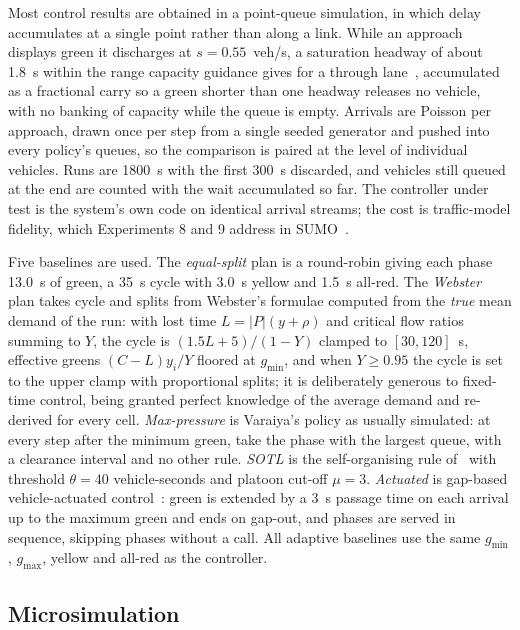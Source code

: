 \documentclass[journal]{IEEEtran}
\begin{document}
Most control results are obtained in a point-queue simulation, in which delay accumulates at a single point
rather than along a link. While an approach displays green it discharges at
$s = 0.55$~veh/s, a saturation headway of about 1.8~s within the range capacity guidance gives for a through
lane~\cite{trb2022hcm}, accumulated as a fractional carry so a green shorter than one headway releases no
vehicle, with no banking of capacity while the queue is empty. Arrivals are Poisson per approach, drawn once
per step from a single seeded generator and pushed into every policy's queues, so the comparison is paired at
the level of individual vehicles. Runs are 1800~s with the first 300~s discarded, and vehicles still queued at
the end are counted with the wait accumulated so far. The controller under test is the system's own code on
identical arrival streams; the cost is traffic-model fidelity, which Experiments 8 and 9 address in
SUMO~\cite{lopez2018microscopic}.

Five baselines are used. The \emph{equal-split} plan is a round-robin giving each phase 13.0~s of green, a
35~s cycle with 3.0~s yellow and 1.5~s all-red.
The \emph{Webster} plan takes cycle and splits from Webster's formulae computed from the \emph{true} mean
demand of the run: with lost time $L = |P|(y + \rho)$ and critical flow ratios summing to $Y$, the cycle is
$(1.5L + 5)/(1 - Y)$ clamped to $[30, 120]$~s, effective greens $(C - L) y_i / Y$ floored at $g_{\min}$, and
when $Y \geq 0.95$ the cycle is set to the upper clamp with proportional splits; it is deliberately generous
to fixed-time control, being granted perfect knowledge of the average demand and re-derived for every cell.
\emph{Max-pressure} is Varaiya's policy as usually simulated: at every step after the minimum green, take the
phase with the largest queue, with a clearance interval and no other rule. \emph{SOTL} is the self-organising
rule of~\cite{gershenson2005sotl,cools2013sotl} with threshold $\theta = 40$ vehicle-seconds and platoon
cut-off $\mu = 3$. \emph{Actuated} is gap-based vehicle-actuated control~\cite{koonce2008timing}: green is
extended by a 3~s passage time on each arrival up to the maximum green and ends on gap-out, and phases are
served in sequence, skipping phases without a call. All adaptive baselines use the same $g_{\min}$,
$g_{\max}$, yellow and all-red as the controller.

\subsection{Microsimulation}
\end{document}
